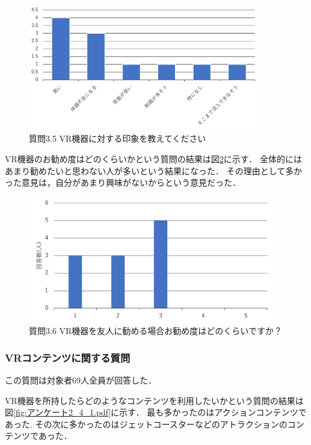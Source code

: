 \documentclass[12pt,a4j]{ltjsarticle}
\begin{document}
\begin{figure}[h]
\begin{center}
 \includegraphics[clip,height=55mm]{
 アンケート2_3_5.pdf}
\end{center}
 \caption{質問3.5 VR機器に対する印象を教えてください}
 \label{fig:アンケート2_3_5.pdf}
\end{figure}

VR機器のお勧め度はどのくらいかという質問の結果は図\ref{fig:アンケート2_3_6.pdf}に示す．
全体的にはあまり勧めたいと思わない人が多いという結果になった．
その理由として多かった意見は，自分があまり興味がないからという意見だった．

\begin{figure}[h]
\begin{center}
 \includegraphics[clip,height=55mm]{
 アンケート2_3_6.pdf}
\end{center}
 \caption{質問3.6 VR機器を友人に勧める場合お勧め度はどのくらいですか？}
 \label{fig:アンケート2_3_6.pdf}
\end{figure}

\subsubsection{VRコンテンツに関する質問}
この質問は対象者69人全員が回答した．

VR機器を所持したらどのようなコンテンツを利用したいかという質問の結果は図\ref{fig:アンケート2_4_1.pdf}に示す．
最も多かったのはアクションコンテンツであった.
その次に多かったのはジェットコースターなどのアトラクションのコンテンツであった．
\end{document}
